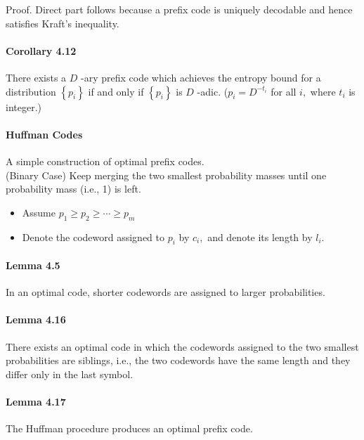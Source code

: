 \documentclass[8pt]{article}
\begin{document}
Proof. Direct part follows because a prefix code is uniquely decodable and hence satisfies Kraft's inequality.

\paragraph{Corollary 4.12} There exists a $D$ -ary prefix code which achieves the entropy bound for a distribution $\left\{p_{i}\right\}$ if and only if $\left\{p_{i}\right\}$ is $D$ -adic. ($p_{i}=D^{-t_{i}}$ for all $i,$ where $t_{i}$ is integer.)

\paragraph{Huffman Codes} A simple construction of optimal prefix codes. \\
 (Binary Case) Keep merging the two smallest probability masses until one probability mass (i.e., 1) is left.
 
 \begin{itemize}
 	\item Assume $p_{1} \geq p_{2} \geq \cdots \geq p_{m}$
 	\item Denote the codeword assigned to $p_{i}$ by $c_{i},$ and denote its length by $l_{i}$.
 \end{itemize}

 \paragraph{Lemma 4.5} In an optimal code, shorter codewords are assigned to larger probabilities.
 
\paragraph{Lemma 4.16} There exists an optimal code in which the codewords assigned to the two smallest probabilities are siblings, i.e., the two codewords have the same length and they differ only in the last symbol.
\paragraph{Lemma 4.17} The Huffman procedure produces an optimal prefix code.
\end{document}

